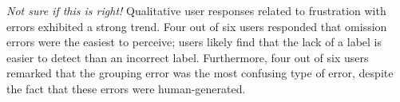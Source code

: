 \documentclass{egpubl}
\begin{document}
\textit{Not sure if this is right!} Qualitative user responses related
to frustration with errors exhibited a strong trend.  Four out of six
users responded that omission errors were the easiest to perceive;
users likely find that the lack of a label is easier to detect than an
incorrect label.  Furthermore, four out of six users remarked that the
grouping error was the most confusing type of error, despite the fact
that these errors were human-generated.




\end{document}
